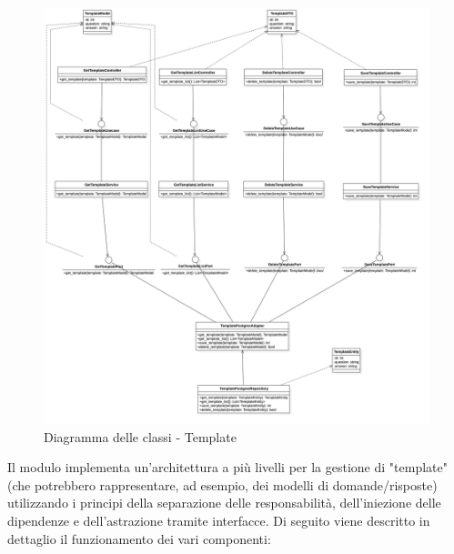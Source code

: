     \begin{figure}[H]
        \centering
        \includegraphics[width=\linewidth, height=0.8\textheight, keepaspectratio]{./img/Template.png}
        \caption{Diagramma delle classi - Template}
        \label{fig:template}
    \end{figure}

    Il modulo implementa un'architettura a più livelli per la gestione di "template" (che potrebbero rappresentare, ad esempio, dei modelli di domande/risposte) utilizzando i principi della separazione delle responsabilità, dell'iniezione delle dipendenze e dell'astrazione tramite interfacce. Di seguito viene descritto in dettaglio il funzionamento dei vari componenti:
    
